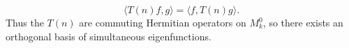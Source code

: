 $$\langle T(n)f, g \rangle = \langle f, T(n)g \rangle.$$
Thus the $T(n)$ are commuting Hermitian operators on $M_k^0$, so there exists an orthogonal basis of simultaneous eigenfunctions.
